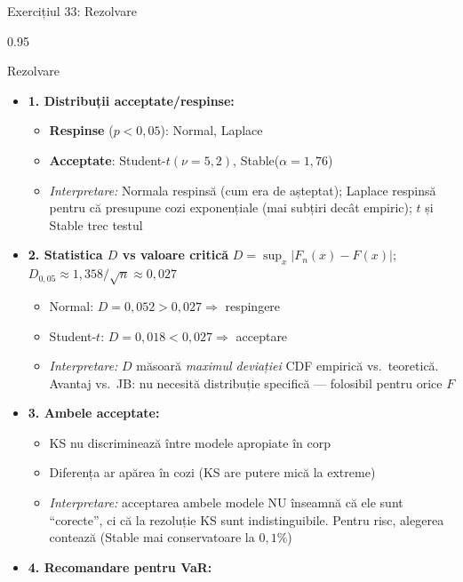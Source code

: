 \documentclass[9pt, aspectratio=169, t]{beamer}
\begin{document}
\begin{frame}[shrink=35]{Exercițiul 33: Rezolvare}
\begin{cminipage}{0.95\textwidth}
\begin{exampleblock}{Rezolvare}
\begin{itemize}\setlength{\itemsep}{0pt}
    \item \textbf{1. Distribuții acceptate/respinse:}
    \begin{itemize}\setlength{\itemsep}{0pt}
        \item \textbf{Respinse} ($p < 0{,}05$): Normal, Laplace
        \item \textbf{Acceptate}: Student-$t(\nu = 5{,}2)$, Stable($\alpha = 1{,}76$)
        \item \textit{Interpretare:} Normala respinsă (cum era de așteptat); Laplace respinsă pentru că presupune cozi exponențiale (mai subțiri decât empiric); $t$ și Stable trec testul
    \end{itemize}
    \item \textbf{2. Statistica $D$ vs valoare critică} \quad $D = \sup_x|F_n(x) - F(x)|$;\ $D_{0{,}05} \approx 1{,}358/\sqrt n \approx 0{,}027$
    \begin{itemize}\setlength{\itemsep}{0pt}
        \item Normal: $D = 0{,}052 > 0{,}027 \Rightarrow$ respingere
        \item Student-$t$: $D = 0{,}018 < 0{,}027 \Rightarrow$ acceptare
        \item \textit{Interpretare:} $D$ măsoară \emph{maximul deviației} CDF empirică vs.\ teoretică. Avantaj vs.\ JB: nu necesită distribuție specifică --- folosibil pentru orice $F$
    \end{itemize}
    \item \textbf{3. Ambele acceptate:}
    \begin{itemize}\setlength{\itemsep}{0pt}
        \item KS nu discriminează între modele apropiate în corp
        \item Diferența ar apărea în cozi (KS are putere mică la extreme)
        \item \textit{Interpretare:} acceptarea ambele modele NU înseamnă că ele sunt ``corecte'', ci că la rezoluție KS sunt indistinguibile. Pentru risc, alegerea contează (Stable mai conservatoare la $0{,}1\%$)
    \end{itemize}
    \item \textbf{4. Recomandare pentru VaR:}
    \begin{itemize}\setlength{\itemsep}{0pt}

\end{itemize}
\end{itemize}
\end{exampleblock}
\end{cminipage}
\end{frame}
\end{document}
